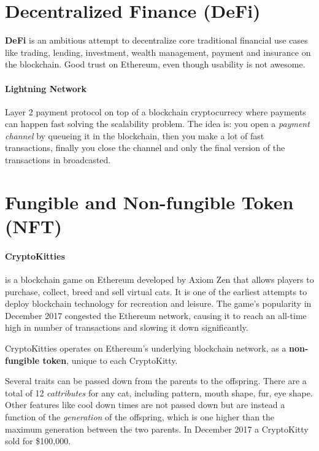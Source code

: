 \section{Decentralized Finance (DeFi)}

\textbf{DeFi} is an ambitious attempt to decentralize core traditional financial use cases like trading, lending, investment, wealth management, payment and insurance on the blockchain. Good trust on Ethereum, even though usability is not awesome.

\paragraph{Lightning Network} Layer 2 payment protocol on top of a blockchain cryptocurrecy where payments can happen fast solving the scalability problem. The idea is: you open a \emph{payment channel} by queueing it in the blockchain, then you make a lot of fast transactions, finally you close the channel and only the final version of the transactions in broadcasted.

\section{Fungible and Non-fungible Token (NFT)}


\paragraph{CryptoKitties} is a blockchain game on Ethereum developed by Axiom Zen that allows players to purchase, collect, breed and sell virtual cats. It is one of the earliest attempts to deploy blockchain technology for recreation and leisure. The game's popularity in December 2017 congested the Ethereum network, causing it to reach an all-time high in number of transactions and slowing it down significantly.

CryptoKitties operates on Ethereum's underlying blockchain network, as a \textbf{non-fungible token}, unique to each CryptoKitty.

Several traits can be passed down from the parents to the offspring. There are a total of 12 \emph{cattributes} for any cat, including pattern, mouth shape, fur, eye shape. Other features like cool down times are not passed down but are instead a function of the \emph{generation} of the offspring, which is one higher than the maximum generation between the two parents. In December 2017 a CryptoKitty sold for \$100,000.

